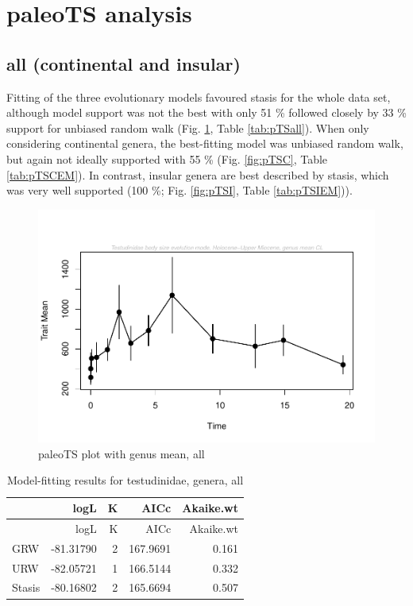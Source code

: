 \FloatBarrier

\section{paleoTS analysis}\label{paleots-analysis}




\subsection{all (continental and
	insular)}\label{all-continental-and-insular}

Fitting of the three evolutionary models favoured stasis for the whole data set, although model support was not the best with only 51 \% followed closely by 33 \% support for unbiased random walk (Fig. \ref{fig:pTSall}, Table \ref{tab:pTSall}). When only considering continental genera, the best-fitting model was unbiased random walk, but again not ideally supported with 55 \% (Fig. \ref{fig:pTSC}, Table \ref{tab:pTSCEM}). In contrast, insular genera are best described by stasis, which was very well supported (100 \%; Fig. \ref{fig:pTSI}, Table \ref{tab:pTSIEM})). 


\begin{figure}[H]
	\centering
	\includegraphics{MA_JJ_files/figure-latex/paleoTSAll-1.pdf}
	\caption{paleoTS plot with genus mean, all}
	\label{fig:pTSall}
\end{figure}

\begin{longtable}[]{@{}lrrrr@{}}
	\caption{Model-fitting results for testudinidae, genera,
		all}
	\label{tab:pTSallEM}\tabularnewline
	\toprule
	& logL & K & AICc & Akaike.wt\tabularnewline
	\midrule
	\endfirsthead
	\toprule
	& logL & K & AICc & Akaike.wt\tabularnewline
	\midrule
	\endhead
	GRW & -81.31790 & 2 & 167.9691 & 0.161\tabularnewline
	URW & -82.05721 & 1 & 166.5144 & 0.332\tabularnewline
	Stasis & -80.16802 & 2 & 165.6694 & 0.507\tabularnewline
	\bottomrule
\end{longtable}

